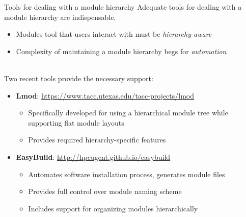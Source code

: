 \documentclass[10pt,xcolor={usenames,dvipsnames}]{beamer}
\begin{document}
\begin{frame}{Tools for dealing with a module hierarchy}
Adequate tools for dealing with a module hierarchy are indispensable.
\begin{itemize}
    \item
        Modules tool that users interact with must be \textit{hierarchy-aware}
    \item
        Complexity of maintaining a module hierarchy begs for \textit{automation}
\end{itemize}~\\

Two recent tools provide the necessary support:
\begin{itemize}    
    \item
        \textbf{Lmod}: \url{https://www.tacc.utexas.edu/tacc-projects/lmod}
        \begin{itemize}
            \item
                Specifically developed for using a hierarchical module
                tree while supporting flat module layouts
            \item
                Provides required hierarchy-specific features
        \end{itemize}
    \item
        \textbf{EasyBuild}: \url{http://hpcugent.github.io/easybuild}
        \begin{itemize}
            \item
                Automates software installation process, generates module files
            \item
                Provides full control over module naming scheme
            \item
                Includes support for organizing modules hierarchically
        \end{itemize}
\end{itemize}
\end{frame}

\end{document}
